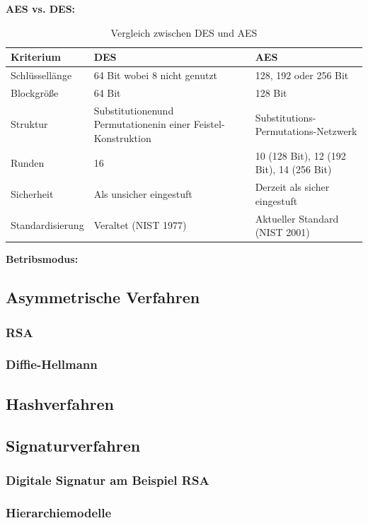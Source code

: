 \documentclass[a4paper,12pt]{article}
\begin{document}
\vspace{1em}
\noindent\textbf{AES vs. DES:}
\begin{table}[H]
    \centering
    \begin{tabular}{|l|l|l|}
        \hline
        \textbf{Kriterium} & \textbf{DES} & \textbf{AES} \\
        \hline
        Schlüssellänge & 64 Bit wobei 8 nicht genutzt & 128, 192 oder 256 Bit \\
        \hline
        Blockgröße & 64 Bit & 128 Bit \\
        \hline
        Struktur & Substitutionenund Permutationenin einer Feistel-Konstruktion & Substitutions-Permutations-Netzwerk \\
        \hline
        Runden & 16 & 10 (128 Bit), 12 (192 Bit), 14 (256 Bit) \\
        \hline
        Sicherheit & Als unsicher eingestuft & Derzeit als sicher eingestuft \\
        \hline
        Standardisierung & Veraltet (NIST 1977) & Aktueller Standard (NIST 2001) \\
        \hline
    \end{tabular}
    \caption{Vergleich zwischen DES und AES}
    \label{tab:aes_vs_des}
\end{table}
\vspace{1em}
\noindent\textbf{Betribsmodus:}
\vspace{1em}


\subsection{Asymmetrische Verfahren}
\subsubsection{RSA}
\subsubsection{Diffie-Hellmann}

\subsection{Hashverfahren}

\subsection{Signaturverfahren}
\subsubsection{Digitale Signatur am Beispiel RSA}
\subsubsection{Hierarchiemodelle}
\end{document}
